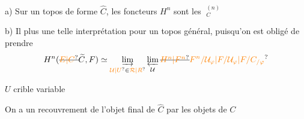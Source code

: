 a) Sur un topos de  forme $\widehat C$, les foncteurs $H^n$ sont les $\mathop{\underleftarrow{\mathrm{lim}}}\nolimits_C^{(n)}$

b) Il  plus une telle interprétation pour un topos général, puisqu'on est obligé de prendre
\[
 H^{n}(\deleted{\unsure{E|C}}\widetilde C,F)\simeq
 \mathop{\underrightarrow{\mathrm{lim}}}_{\unsure{\mathcal U|U}\in\unsure{\mathcal R|R}}
 \mathop{\underleftarrow{\mathrm{lim}}}_{\mathcal U}
 \deleted{\unsure{H^n|F^n}}\unsure{F^{n}/\mathcal U_{\varphi}|F/\mathcal U_{\varphi}|F/C_{/\varphi}}
\]

$U$ crible variable

On a un recouvrement de l'objet final de $\widehat C$ par les objets de $C$

